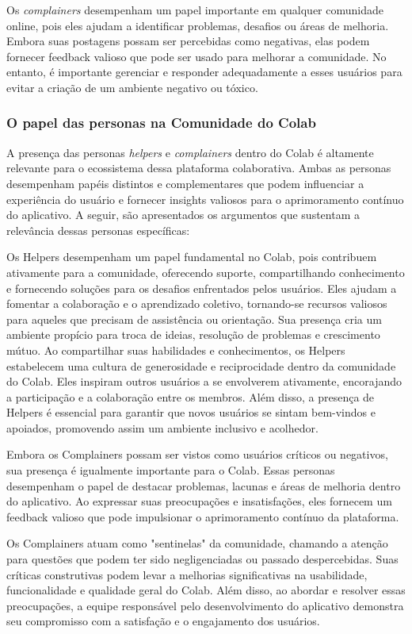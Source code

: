 Os \textit{complainers} desempenham um papel importante em qualquer comunidade online, pois eles ajudam a identificar problemas, desafios ou áreas de melhoria. Embora suas postagens possam ser percebidas como negativas, elas podem fornecer feedback valioso que pode ser usado para melhorar a comunidade. No entanto, é importante gerenciar e responder adequadamente a esses usuários para evitar a criação de um ambiente negativo ou tóxico.

\subsubsection*{O papel das personas na Comunidade do Colab}

A presença das personas \textit{helpers} e \textit{complainers} dentro do Colab é altamente relevante para o ecossistema dessa plataforma colaborativa. Ambas as personas desempenham papéis distintos e complementares que podem influenciar a experiência do usuário e fornecer insights valiosos para o aprimoramento contínuo do aplicativo. A seguir, são apresentados os argumentos que sustentam a relevância dessas personas específicas:

Os Helpers desempenham um papel fundamental no Colab, pois contribuem ativamente para a comunidade, oferecendo suporte, compartilhando conhecimento e fornecendo soluções para os desafios enfrentados pelos usuários. Eles ajudam a fomentar a colaboração e o aprendizado coletivo, tornando-se recursos valiosos para aqueles que precisam de assistência ou orientação. Sua presença cria um ambiente propício para troca de ideias, resolução de problemas e crescimento mútuo. Ao compartilhar suas habilidades e conhecimentos, os Helpers estabelecem uma cultura de generosidade e reciprocidade dentro da comunidade do Colab. Eles inspiram outros usuários a se envolverem ativamente, encorajando a participação e a colaboração entre os membros. Além disso, a presença de Helpers é essencial para garantir que novos usuários se sintam bem-vindos e apoiados, promovendo assim um ambiente inclusivo e acolhedor.

Embora os Complainers possam ser vistos como usuários críticos ou negativos, sua presença é igualmente importante para o Colab. Essas personas desempenham o papel de destacar problemas, lacunas e áreas de melhoria dentro do aplicativo. Ao expressar suas preocupações e insatisfações, eles fornecem um feedback valioso que pode impulsionar o aprimoramento contínuo da plataforma.

Os Complainers atuam como "sentinelas" da comunidade, chamando a atenção para questões que podem ter sido negligenciadas ou passado despercebidas. Suas críticas construtivas podem levar a melhorias significativas na usabilidade, funcionalidade e qualidade geral do Colab. Além disso, ao abordar e resolver essas preocupações, a equipe responsável pelo desenvolvimento do aplicativo demonstra seu compromisso com a satisfação e o engajamento dos usuários.

